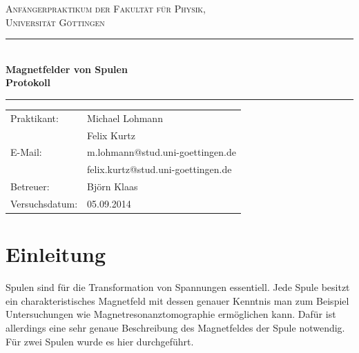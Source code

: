 \documentclass[12pt,a4paper,titlepage,headinclude,bibtotoc]{scrartcl}
\begin{document}
\begin{titlepage}
\centering
\textsc{\Large Anfängerpraktikum der Fakultät für
  Physik,\\[1.5ex] Universität Göttingen}

\vspace*{3.5cm}

\rule{\textwidth}{1pt}\\[0.5cm]
{\huge \bfseries
  Magnetfelder von Spulen\\[1.5ex]
  Protokoll}\\[0.5cm]
\rule{\textwidth}{1pt}

\vspace*{3.5cm}

\begin{Large}
\begin{tabular}{ll}
Praktikant: &  Michael Lohmann\\
 &  Felix Kurtz\\
 E-Mail: & m.lohmann@stud.uni-goettingen.de\\
 &  felix.kurtz@stud.uni-goettingen.de\\
 Betreuer: & Björn Klaas\\
 Versuchsdatum: & 05.09.2014\\
\end{tabular}
\end{Large}

\vspace*{0.8cm}

\begin{Large}
\end{Large}

\end{titlepage}

\tableofcontents

\newpage

\section{Einleitung}
\label{sec:einleitung}
Spulen sind für die Transformation von Spannungen essentiell.
Jede Spule besitzt ein charakteristisches Magnetfeld mit dessen genauer Kenntnis man zum Beispiel Untersuchungen wie Magnetresonanztomographie ermöglichen kann.
Dafür ist allerdings eine sehr genaue Beschreibung des Magnetfeldes der Spule notwendig.
Für zwei Spulen wurde es hier durchgeführt.
\end{document}
